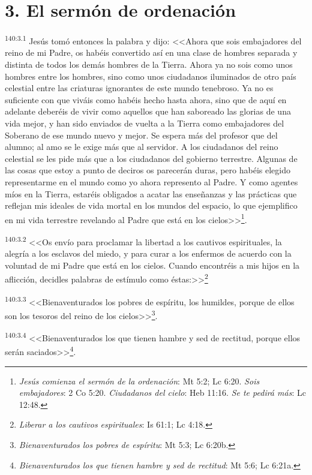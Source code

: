 \section*{3. El sermón de ordenación}
\par 
\textsuperscript{140:3.1} Jesús tomó entonces la palabra y dijo: <<Ahora que sois embajadores del reino de mi Padre, os habéis convertido así en una clase de hombres separada y distinta de todos los demás hombres de la Tierra. Ahora ya no sois como unos hombres entre los hombres, sino como unos ciudadanos iluminados de otro país celestial entre las criaturas ignorantes de este mundo tenebroso. Ya no es suficiente con que viváis como habéis hecho hasta ahora, sino que de aquí en adelante deberéis de vivir como aquellos que han saboreado las glorias de una vida mejor, y han sido enviados de vuelta a la Tierra como embajadores del Soberano de ese mundo nuevo y mejor. Se espera más del profesor que del alumno; al amo se le exige más que al servidor. A los ciudadanos del reino celestial se les pide más que a los ciudadanos del gobierno terrestre. Algunas de las cosas que estoy a punto de deciros os parecerán duras, pero habéis elegido representarme en el mundo como yo ahora represento al Padre. Y como agentes míos en la Tierra, estaréis obligados a acatar las enseñanzas y las prácticas que reflejan mis ideales de vida mortal en los mundos del espacio, lo que ejemplifico en mi vida terrestre revelando al Padre que está en los cielos>>\footnote{\textit{Jesús comienza el sermón de la ordenación}: Mt 5:2; Lc 6:20. \textit{Sois embajadores}: 2 Co 5:20. \textit{Ciudadanos del cielo}: Heb 11:16. \textit{Se te pedirá más}: Lc 12:48.}.

\par 
\textsuperscript{140:3.2} <<Os envío para proclamar la libertad a los cautivos espirituales, la alegría a los esclavos del miedo, y para curar a los enfermos de acuerdo con la voluntad de mi Padre que está en los cielos. Cuando encontréis a mis hijos en la aflicción, decidles palabras de estímulo como éstas:>>\footnote{\textit{Liberar a los cautivos espirituales}: Is 61:1; Lc 4:18.}

\par 
\textsuperscript{140:3.3} <<Bienaventurados los pobres de espíritu, los humildes, porque de ellos son los tesoros del reino de los cielos>>\footnote{\textit{Bienaventurados los pobres de espíritu}: Mt 5:3; Lc 6:20b.}.

\par 
\textsuperscript{140:3.4} <<Bienaventurados los que tienen hambre y sed de rectitud, porque ellos serán saciados>>\footnote{\textit{Bienaventurados los que tienen hambre y sed de rectitud}: Mt 5:6; Lc 6:21a.}.

